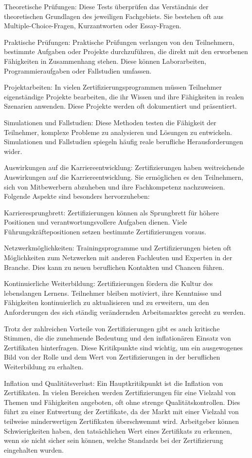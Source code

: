 Theoretische Prüfungen: Diese Tests überprüfen das Verständnis der theoretischen Grundlagen des jeweiligen Fachgebiets. Sie bestehen oft aus Multiple-Choice-Fragen, Kurzantworten oder Essay-Fragen.

Praktische Prüfungen: Praktische Prüfungen verlangen von den Teilnehmern, bestimmte Aufgaben oder Projekte durchzuführen, die direkt mit den erworbenen Fähigkeiten in Zusammenhang stehen. Diese können Laborarbeiten, Programmieraufgaben oder Fallstudien umfassen.

Projektarbeiten: In vielen Zertifizierungsprogrammen müssen Teilnehmer eigenständige Projekte bearbeiten, die ihr Wissen und ihre Fähigkeiten in realen Szenarien anwenden. Diese Projekte werden oft dokumentiert und präsentiert.

Simulationen und Fallstudien: Diese Methoden testen die Fähigkeit der Teilnehmer, komplexe Probleme zu analysieren und Lösungen zu entwickeln. Simulationen und Fallstudien spiegeln häufig reale berufliche Herausforderungen wider.

Auswirkungen auf die Karriereentwicklung:
Zertifizierungen haben weitreichende Auswirkungen auf die Karriereentwicklung. Sie ermöglichen es den Teilnehmern, sich von Mitbewerbern abzuheben und ihre Fachkompetenz nachzuweisen. Folgende Aspekte sind besonders hervorzuheben:

Karrieresprungbrett: Zertifizierungen können als Sprungbrett für höhere Positionen und verantwortungsvollere Aufgaben dienen. Viele Führungskräftepositionen setzen bestimmte Zertifizierungen voraus.

Netzwerkmöglichkeiten: Trainingsprogramme und Zertifizierungen bieten oft Möglichkeiten zum Netzwerken mit anderen Fachleuten und Experten in der Branche. Dies kann zu neuen beruflichen Kontakten und Chancen führen.

Kontinuierliche Weiterbildung: Zertifizierungen fördern die Kultur des lebenslangen Lernens. Teilnehmer bleiben motiviert, ihre Kenntnisse und Fähigkeiten kontinuierlich zu aktualisieren und zu erweitern, um den Anforderungen des sich ständig verändernden Arbeitsmarktes gerecht zu werden.

Trotz der zahlreichen Vorteile von Zertifizierungen gibt es auch kritische Stimmen, die die zunehmende Bedeutung und den inflationären Einsatz von Zertifikaten hinterfragen. Diese Kritikpunkte sind wichtig, um ein ausgewogenes Bild von der Rolle und dem Wert von Zertifizierungen in der beruflichen Weiterbildung zu erhalten.

Inflation und Qualitätsverlust:
Ein Hauptkritikpunkt ist die Inflation von Zertifikaten. In vielen Bereichen werden Zertifizierungen für eine Vielzahl von Themen und Fähigkeiten angeboten, oft ohne strenge Qualitätskontrollen. Dies führt zu einer Entwertung der Zertifikate, da der Markt mit einer Vielzahl von teilweise minderwertigen Zertifikaten überschwemmt wird. Arbeitgeber können Schwierigkeiten haben, den tatsächlichen Wert eines Zertifikats zu erkennen, wenn sie nicht sicher sein können, welche Standards bei der Zertifizierung eingehalten wurden.

